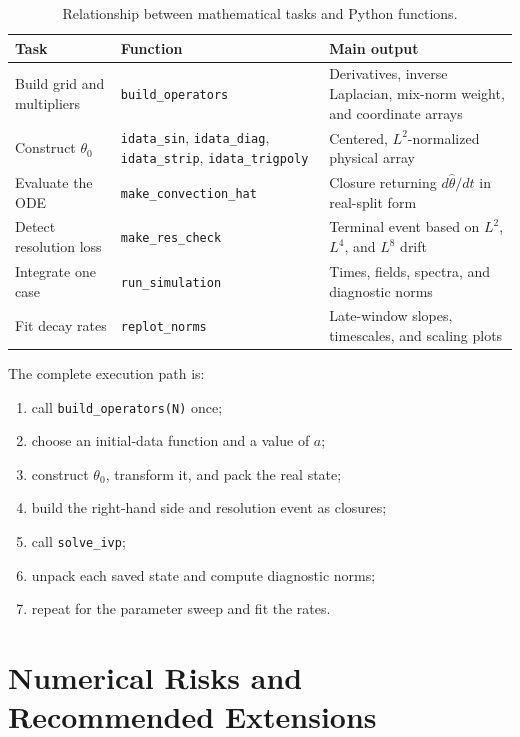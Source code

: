 \documentclass[12pt,a4paper]{article}
\theoremstyle{definition}
\begin{document}
\begin{table}[htbp]
\centering
\small
\caption{Relationship between mathematical tasks and Python functions.}
\begin{tabularx}{\linewidth}{@{}
  >{\raggedright\arraybackslash}p{3.2cm}
  >{\raggedright\arraybackslash}p{4.0cm}
  >{\raggedright\arraybackslash}X@{}}
\toprule
Task & Function & Main output \\
\midrule
Build grid and multipliers & \texttt{build\_operators} & Derivatives,
inverse Laplacian, mix-norm weight, and coordinate arrays \\
Construct $\theta_0$ & \texttt{idata\_sin}, \texttt{idata\_diag},
\texttt{idata\_strip}, \texttt{idata\_trigpoly} & Centered,
$L^2$-normalized physical array \\
Evaluate the ODE & \texttt{make\_convection\_hat} & Closure returning
$d\widehat\theta/dt$ in real-split form \\
Detect resolution loss & \texttt{make\_res\_check} & Terminal event based
on $L^2$, $L^4$, and $L^8$ drift \\
Integrate one case & \texttt{run\_simulation} & Times, fields, spectra,
and diagnostic norms \\
Fit decay rates & \texttt{replot\_norms} & Late-window slopes, timescales,
and scaling plots \\
\bottomrule
\end{tabularx}
\end{table}

The complete execution path is:
\begin{enumerate}
  \item call \texttt{build\_operators(N)} once;
  \item choose an initial-data function and a value of $a$;
  \item construct $\theta_0$, transform it, and pack the real state;
  \item build the right-hand side and resolution event as closures;
  \item call \texttt{solve\_ivp};
  \item unpack each saved state and compute diagnostic norms;
  \item repeat for the parameter sweep and fit the rates.
\end{enumerate}

\section{Numerical Risks and Recommended Extensions}
\end{document}
